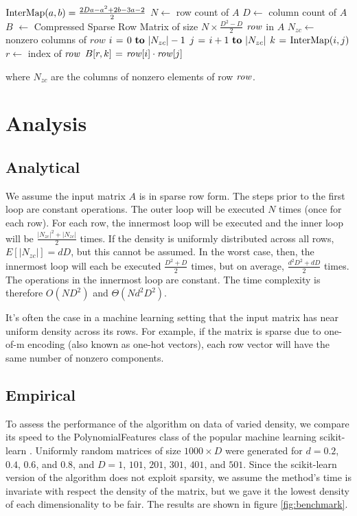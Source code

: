 \documentclass[11pt,twocolumn]{article}
\begin{document}
\begin{codebox}
    \zi $\func{InterMap}(a, b) = \frac{2Da-a^2+2b-3a-2}{2}$
    \zi $N \gets$ row count of $A$
    \zi $D \gets$ column count of $A$
    \zi $B$ $\gets$ Compressed Sparse Row Matrix of size $N \times \frac{D^2-D}{2}$
    \zi \For $\id{row}$ in $A$ \Do
    \zi     $N_{zc} \gets$ nonzero columns of $row$
    \zi     \For $i \gets 0 \To |N_{zc}|-1$ \Do
    \zi         \For $j \gets i+1 \To |N_{zc}|$ \Do
    \zi             $k \gets \func{InterMap}(i, j)$
    \zi             $r \gets$ index of $\id{row}$
    \zi             $B[r, k] \gets \id{row}[i] \cdot \id{row}[j]$
                \End
            \End
       	\End
\end{codebox}

where $N_{zc}$ are the columns of nonzero elements of row $\id{row}$.

\section{Analysis}

\subsection{Analytical}
We assume the input matrix $A$ is in sparse row form. The steps prior to the first loop are
constant operations. The outer loop will be executed $N$ times (once for each row). For each row, 
the innermost loop will be executed and the inner loop will be $\frac{|N_{zc}|^2+|N_{zc}|}{2}$ times.
If the density is uniformly distributed across all rows, $E[|N_{zc}|] = dD$, but this cannot be assumed. In the worst case,
then, the innermost loop will each be executed $\frac{D^2+D}{2}$ times, but on average, $\frac{d^2D^2+dD}{2}$ times.
The operations in the innermost loop are constant. The time complexity is therefore $O(ND^2)$ and $\Theta(Nd^2D^2)$.

It's often the case in a machine learning setting that the input matrix has near uniform density across its rows.
For example, if the matrix is sparse due to one-of-m encoding (also known as one-hot vectors), each row vector will
have the same number of nonzero components.

\subsection{Empirical}
To assess the performance of the algorithm on data of varied density, we compare its speed
to the PolynomialFeatures class of the popular machine learning scikit-learn \cite{scikit-learn}.
Uniformly random matrices of size $1000 \times D$ were generated for $d=0.2$, $0.4$, $0.6$, and $0.8$, and 
$D=1$, $101$, $201$, $301$, $401$, and $501$. Since the scikit-learn version of the algorithm
does not exploit sparsity, we assume the method's time is invariate with respect the density of the matrix, but
we gave it the lowest density of each dimensionality to be fair. The results are shown in figure \eqref{fig:benchmark}.
\end{document}
